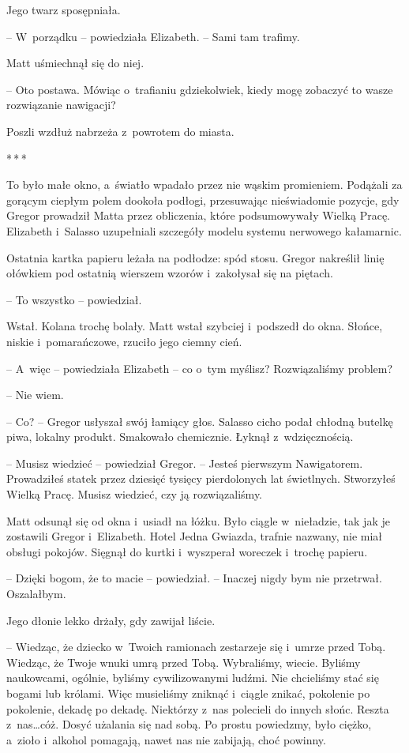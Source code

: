\documentclass[oneside,polish,12pt,sfheadings]{mwbk}
\newcommand{\threeast}{\bigskip\par\centerline{*\,*\,*}\medskip\par}%
\begin{document}
Jego twarz sposępniała.

-- W~porządku -- powiedziała Elizabeth. -- Sami tam trafimy.

Matt uśmiechnął się do niej. 

-- Oto postawa. Mówiąc o~trafianiu
gdziekolwiek, kiedy mogę zobaczyć to wasze rozwiązanie nawigacji?

Poszli wzdłuż nabrzeża z~powrotem do miasta.

\threeast

To było małe okno, a~światło wpadało przez nie wąskim promieniem.
Podążali za gorącym ciepłym polem dookoła podłogi, przesuwając
nieświadomie pozycje, gdy Gregor prowadził Matta przez obliczenia, które
podsumowywały Wielką Pracę. Elizabeth i~Salasso uzupełniali szczegóły
modelu systemu nerwowego kałamarnic.

Ostatnia kartka papieru leżała na podłodze: spód stosu. Gregor nakreślił
linię ołówkiem pod ostatnią wierszem wzorów i~zakołysał się na piętach.

-- To wszystko -- powiedział.

Wstał. Kolana trochę bolały. Matt wstał szybciej i~podszedł do okna.
Słońce, niskie i~pomarańczowe, rzuciło jego ciemny cień.

-- A~więc -- powiedziała Elizabeth -- co o~tym myślisz? Rozwiązaliśmy
problem?

-- Nie wiem.

-- Co? -- Gregor usłyszał swój łamiący głos. Salasso cicho podał chłodną
butelkę piwa, lokalny produkt. Smakowało chemicznie. Łyknął z~wdzięcznością.

-- Musisz wiedzieć -- powiedział Gregor. -- Jesteś pierwszym Nawigatorem.
Prowadziłeś statek przez dziesięć tysięcy pierdolonych lat świetlnych.
Stworzyłeś Wielką Pracę. Musisz wiedzieć, czy ją rozwiązaliśmy.

Matt odsunął się od okna i~usiadł na łóżku. Było ciągle w~nieładzie, tak
jak je zostawili Gregor i~Elizabeth. Hotel Jedna Gwiazda, trafnie
nazwany, nie miał obsługi pokojów. Sięgnął do kurtki i~wyszperał
woreczek i~trochę papieru.

-- Dzięki bogom, że to macie -- powiedział. -- Inaczej nigdy bym nie
przetrwał. Oszalałbym.

Jego dłonie lekko drżały, gdy zawijał liście.

-- Wiedząc, że dziecko w~Twoich ramionach zestarzeje się i~umrze przed
Tobą. Wiedząc, że Twoje wnuki umrą przed Tobą. Wybraliśmy, wiecie.
Byliśmy naukowcami, ogólnie, byliśmy cywilizowanymi ludźmi. Nie
chcieliśmy stać się bogami lub królami. Więc musieliśmy zniknąć i~ciągle
znikać, pokolenie po pokolenie, dekadę po dekadę. Niektórzy z~nas
polecieli do innych słońc. Reszta z~nas\ldots cóż. Dosyć użalania się nad
sobą. Po prostu powiedzmy, było ciężko, a~zioło i~alkohol pomagają,
nawet nas nie zabijają, choć powinny.
\end{document}
